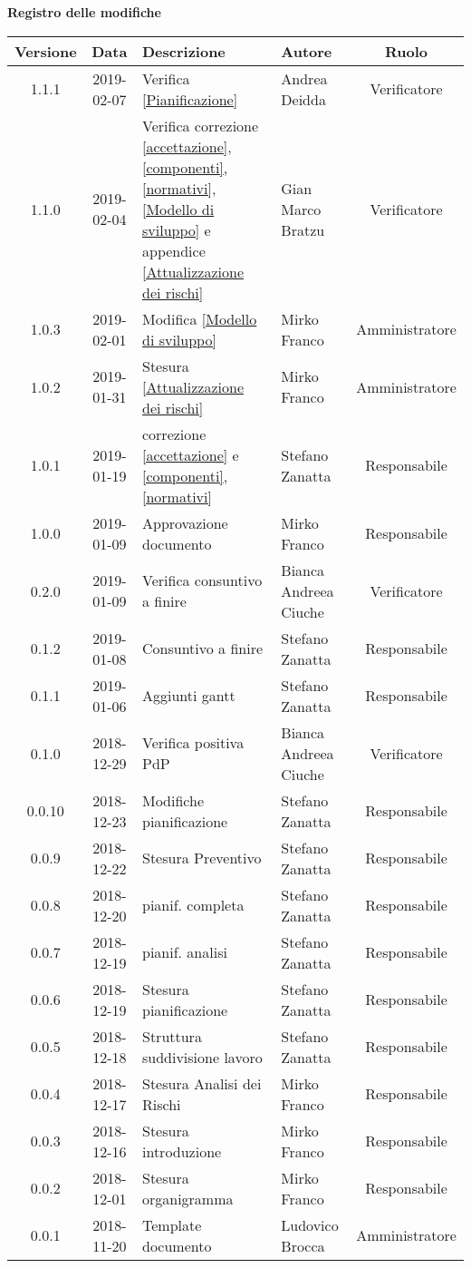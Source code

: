 	\begin{center}
		\textbf{Registro delle modifiche}
	\end{center}
	\begin{center}
		\begin{tabularx}{\textwidth}{|c|c|X|X|c|}
			\hline
			\textbf{Versione} & \textbf{Data} & \textbf{Descrizione} & \textbf{Autore} & \textbf{Ruolo} \\
			\hline
			1.1.1 & 2019-02-07 & Verifica \ref{Pianificazione} & Andrea Deidda & Verificatore\\
			\hline
			1.1.0 & 2019-02-04 & Verifica correzione \ref{accettazione},  \ref{componenti}, \ref{normativi}, \ref{Modello di sviluppo} e appendice \ref{Attualizzazione dei rischi} & Gian Marco Bratzu & Verificatore\\
			\hline
			1.0.3 & 2019-02-01 & Modifica \ref{Modello di sviluppo} & Mirko Franco & Amministratore \\
			\hline
			1.0.2 & 2019-01-31 & Stesura \ref{Attualizzazione dei rischi} & Mirko Franco & Amministratore \\
			\hline
			1.0.1 & 2019-01-19 & correzione \ref{accettazione} e \ref{componenti},\ref{normativi} & Stefano Zanatta & Responsabile\\
			\hline
			1.0.0 & 2019-01-09 & Approvazione documento & Mirko Franco & Responsabile\\
			\hline
			0.2.0 & 2019-01-09 & Verifica consuntivo a finire & Bianca Andreea Ciuche& Verificatore\\
			\hline
			0.1.2 & 2019-01-08 & Consuntivo a finire & Stefano Zanatta & Responsabile\\
			\hline
			0.1.1 & 2019-01-06 & Aggiunti gantt & Stefano Zanatta & Responsabile\\
			\hline
			0.1.0 & 2018-12-29 & Verifica positiva PdP & Bianca Andreea Ciuche& Verificatore\\
			\hline
			0.0.10 & 2018-12-23 & Modifiche pianificazione & Stefano Zanatta & Responsabile\\
			\hline
			0.0.9 & 2018-12-22 & Stesura Preventivo & Stefano Zanatta & Responsabile\\
			\hline
			0.0.8 & 2018-12-20 & pianif. completa& Stefano Zanatta & Responsabile\\
			\hline
			0.0.7 & 2018-12-19 & pianif. analisi& Stefano Zanatta & Responsabile\\
			\hline
			0.0.6 & 2018-12-19 & Stesura pianificazione & Stefano Zanatta & Responsabile\\
			\hline
			0.0.5 & 2018-12-18 & Struttura suddivisione lavoro & Stefano Zanatta & Responsabile\\
			\hline
			0.0.4 & 2018-12-17 & Stesura Analisi dei Rischi & Mirko Franco & Responsabile\\
			\hline
			0.0.3 & 2018-12-16 & Stesura introduzione &Mirko Franco& Responsabile\\
			\hline
			0.0.2 & 2018-12-01 & Stesura organigramma &Mirko Franco& Responsabile\\
			\hline
			0.0.1 & 2018-11-20 & Template documento& Ludovico Brocca & Amministratore\\			
			\hline
			
		\end{tabularx}
	\end{center}
\newpage